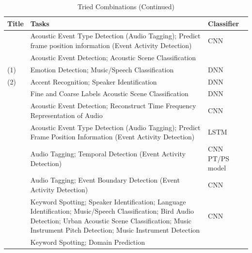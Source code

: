 	\begin{table}[ht]
		\caption{Tried Combinations (Continued)} %
		\centering %
		\begin{tabular}{p{}p{}p{}} %
			\hline\hline %
			Title & Tasks & Classifier   \\ [0.5ex] %
			\hline %
			\citet{xia2019multi} & Acoustic Event Type Detection (Audio Tagging); Predict frame position information (Event Activity Detection) & CNN \\ \hline
			\citet{xu2019multi} & Acoustic Event Detection; Acoustic Scene Classification & \\ \hline
			\citet{zeng2019spectrogram} (1) & Emotion Detection; Music/Speech Classification & DNN \\ \hline
			\citet{zeng2019spectrogram} (2) & Accent Recognition; Speaker Identification & DNN \\ \hline
			\citet{abrol2020learning} & Fine and Coarse Labels Acoustic Scene Classification & DNN \\ \hline
			\citet{deshmukh2020multi} & Acoustic Event Detection; Reconstruct Time Frequency Representation of Audio &  CNN \\ \hline
			\citet{fernando2020temporarily} & Acoustic Event Type Detection (Audio Tagging); Predict Frame Position Information (Event Activity Detection) & LSTM \\ \hline
			\citet{huang2020guided} & Audio Tagging; Temporal Detection (Event Activity Detection) & CNN PT/PS model \\ \hline
			\citet{huang2020multi} & Audio Tagging; Event Boundary Detection (Event Activity Detection) & CNN \\ \hline
			\citet{tagliasacchi2020multi} & Keyword Spotting; Speaker Identification; Language Identification; Music/Speech Classification; Bird Audio Detection; Urban Acoustic Scene Classification; Music Instrument Pitch Detection; Music Instrument Detection & CNN  \\ \hline
			\citet{wu2020domain} & Keyword Spotting; Domain Prediction & \\
			[1ex] %
			\hline %
		\end{tabular}
		\label{table:combinations2} %
	\end{table}


